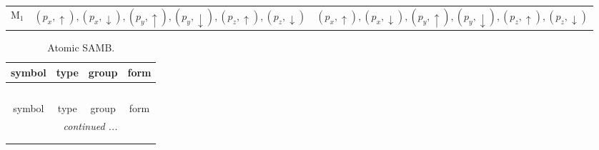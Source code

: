 \documentclass[fleqn,10pt,landscape]{article}
\begin{document}
\begin{itemize}
\begin{center}
\begin{longtable}{c|c|c}
M$_{1}$ & $(p_{x},\uparrow), (p_{x},\downarrow), (p_{y},\uparrow), (p_{y},\downarrow), (p_{z},\uparrow), (p_{z},\downarrow)$ & $(p_{x},\uparrow), (p_{x},\downarrow), (p_{y},\uparrow), (p_{y},\downarrow), (p_{z},\uparrow), (p_{z},\downarrow)$ \\
\end{longtable}
\end{center}
\begin{center}
\renewcommand{\arraystretch}{1.3}
\begin{longtable}{c|c|c|c}
\caption{Atomic SAMB.}
 \\
 \hline \hline
symbol & type & group & form \\ \hline \endfirsthead

\multicolumn{3}{l}{\tablename\ \thetable{}} \\
 \hline \hline
symbol & type & group & form \\ \hline \endhead

 \hline \hline
\multicolumn{3}{r}{\footnotesize\it continued ...} \\ \endfoot

 \hline \hline
\multicolumn{3}{r}{} \\ \endlastfoot


\end{longtable}
\end{center}
\end{itemize}
\end{document}
